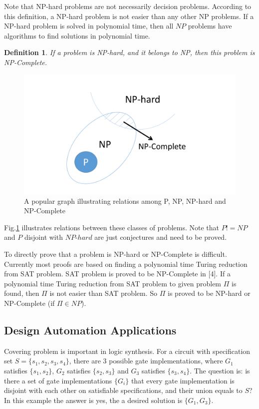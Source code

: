\documentclass[11pt,twoside, onecolumn]{IEEEtran}
\newtheorem{Definition}{Definition}[section]
\begin{document}
Note that NP-hard problems are not necessarily decision problems. 
According to this definition, a NP-hard problem is not easier than any other NP problems. If a NP-hard
problem is solved in polynomial time, then all $NP$ problems have algorithms to find solutions in polynomial time.

\begin{Definition}
If a problem is NP-hard, and it belongs to NP, then this problem is \emph{NP-Complete}.
\end{Definition}

\begin{figure}[hbt]
	\begin{center}
	\includegraphics[scale=0.4]{fig_NP.pdf}
	\end{center}
	\caption{A popular graph illustrating relations among P, NP, NP-hard and NP-Complete}
	\label{fig:NP}
\end{figure}

Fig.\ref{fig:NP} illustrates relations between these classes of problems. Note that $P!=NP$ and
$P$ disjoint with $NP$-$hard$ are just conjectures and need to be proved.

To directly prove that a problem is NP-hard or NP-Complete is difficult. Currently most proofs are based
on finding a polynomial time Turing reduction from SAT problem. SAT problem is proved to be NP-Complete in
[4]. If a polynomial time Turing reduction from SAT problem to given problem $\Pi$ is found, then $\Pi$
is not easier than SAT problem. So $\Pi$ is proved to be NP-hard or NP-Complete (if $\Pi \in NP$).

\subsection{Design Automation Applications}
Covering problem is important in logic synthesis. For a circuit with specification set $S = \{s_1, s_2, s_3, s_4\}$, there are 3 possible gate implementations, where $G_1$ satisfies $\{s_1, s_2\}$, $G_2$ satisfies
$\{s_2,s_3\}$ and $G_3$ satisfies $\{s_3,s_4\}$. The question is: is there a set of gate implementations
$\{G_i\}$ that every gate implementation is disjoint with each other on satisfiable specifications, 
and their union equals to $S$? In this example the answer is yes, the a desired solution is $\{G_1, G_3\}$.
\end{document}
